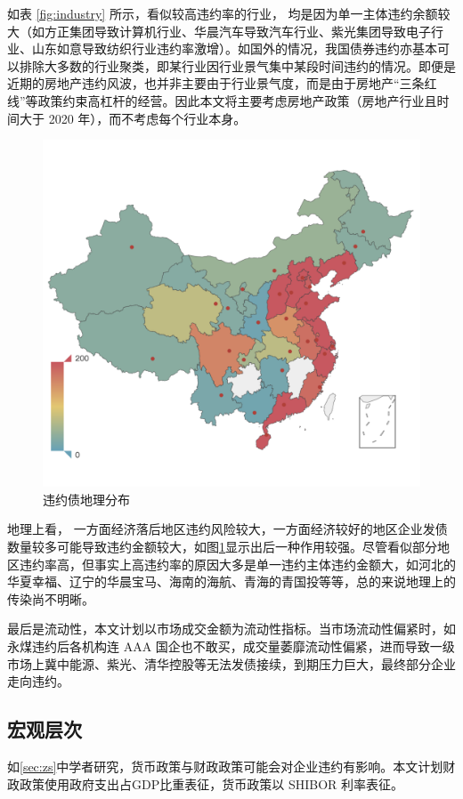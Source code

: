 如表 \ref{fig:industry} 所示，看似较高违约率的行业，
均是因为单一主体违约余额较大（如方正集团导致计算机行业、华晨汽车导致汽车行业、紫光集团导致电子行业、山东如意导致纺织行业违约率激增）。如国外的情况\cite{azizpour2018exploring}，我国债券违约亦基本可以排除大多数的行业聚类，即某行业因行业景气集中某段时间违约的情况。即便是近期的房地产违约风波，也并非主要由于行业景气度，而是由于房地产“三条红线”等政策约束高杠杆的经营。因此本文将主要考虑房地产政策（房地产行业且时间大于 2020 年），而不考虑每个行业本身。

\begin{figure}[h]
	\centering
	\includegraphics[width=.9\linewidth]{./data/default_by_geo.png}
	\caption{\label{fig:geo}违约债地理分布}
\end{figure}
地理上看，
一方面经济落后地区违约风险较大，一方面经济较好的地区企业发债数量较多可能导致违约金额较大，如图\ref{fig:geo}显示出后一种作用较强。尽管看似部分地区违约率高，但事实上高违约率的原因大多是单一违约主体违约金额大，如河北的华夏幸福、辽宁的华晨宝马、海南的海航、青海的青国投等等，总的来说地理上的传染尚不明晰。

最后是流动性，本文计划以市场成交金额为流动性指标。当市场流动性偏紧时，如永煤违约后各机构连 AAA 国企也不敢买，成交量萎靡流动性偏紧，进而导致一级市场上冀中能源、紫光、清华控股等无法发债接续，到期压力巨大，最终部分企业走向违约。
\subsection{宏观层次}
如\ref{sec:zs}中学者研究，货币政策与财政政策可能会对企业违约有影响。本文计划财政政策使用政府支出占GDP比重表征，货币政策以 SHIBOR 利率表征。

